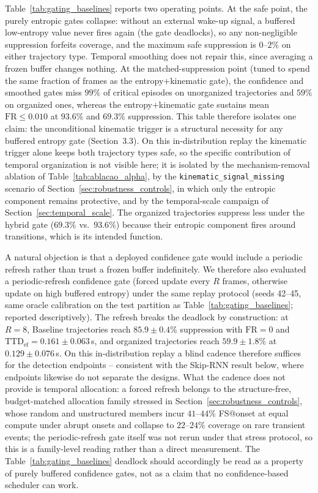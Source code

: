 \documentclass[a4paper,fleqn]{cas-dc}
\begin{document}
{Table~\ref{tab:gating_baselines} reports two operating points. At the safe
point, the purely entropic gates collapse: without an external wake-up signal,
a buffered low-entropy value never fires again (the gate deadlocks), so any
non-negligible suppression forfeits coverage, and the maximum safe suppression
is $0$--$2\%$ on either trajectory type. Temporal smoothing does not repair
this, since averaging a frozen buffer changes nothing. At the
matched-suppression point (tuned to spend the same fraction of frames as the
entropy+kinematic gate), the confidence and smoothed gates miss
$99\%$ of critical episodes on unorganized trajectories and $59\%$ on
organized ones, whereas the entropy+kinematic gate sustains mean
$\mathrm{FR} \le 0.010$ at $93.6\%$ and $69.3\%$ suppression. This table
therefore isolates one claim: the unconditional kinematic trigger is a
structural necessity for any buffered entropy gate (Section~3.3). On this
in-distribution replay the kinematic trigger alone keeps both trajectory
types safe, so the specific contribution of temporal organization is not
visible here; it is isolated by the mechanism-removal ablation of
Table~\ref{tab:ablacao_alpha}, by the
\texttt{kinematic\_\allowbreak signal\_\allowbreak missing} scenario of
Section~\ref{sec:robustness_controls}, in which only the entropic component
remains protective, and by the temporal-scale campaign of
Section~\ref{sec:temporal_scale}. The organized trajectories suppress less
under the hybrid gate ($69.3\%$ vs.\ $93.6\%$) because their entropic component
fires around transitions, which is its intended function.

{\color{\revcolor}A natural objection is that a deployed confidence gate would
include a periodic refresh rather than trust a frozen buffer indefinitely. We
therefore also evaluated a periodic-refresh confidence gate (forced update
every $R$ frames, otherwise update on high buffered entropy) under the same
replay protocol (seeds 42--45, same oracle calibration on the test partition
as Table~\ref{tab:gating_baselines}; reported descriptively). The refresh
breaks the deadlock by construction: at $R{=}8$,
Baseline trajectories reach $85.9 \pm 0.4\%$ suppression with
$\mathrm{FR}=0$ and $\mathrm{TTD}_{\mathrm{ef}} = 0.161 \pm 0.063$\,s, and
organized trajectories reach $59.9 \pm 1.8\%$ at $0.129 \pm 0.076$\,s. On
this in-distribution replay a blind cadence therefore suffices for the
detection endpoints -- consistent with the Skip-RNN result below, where
endpoints likewise do not separate the designs. What the cadence does not
provide is temporal allocation: a forced refresh belongs to the
structure-free, budget-matched allocation family stressed in
Section~\ref{sec:robustness_controls}, whose random and unstructured members
incur $41$--$44\%$ FS@onset at equal compute under abrupt onsets and collapse
to $22$--$24\%$ coverage on rare transient events; the periodic-refresh gate
itself was not rerun under that stress protocol, so this is a family-level
reading rather than a direct measurement. The Table~\ref{tab:gating_baselines}
deadlock should accordingly be read as a property of purely buffered
confidence gates, not as a claim that no confidence-based scheduler can
work.}

}
\end{document}
